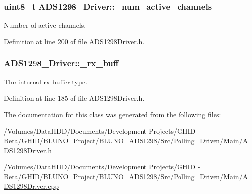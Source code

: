 \hypertarget{class_a_d_s1298___driver_adffccf9bfd40ec402181967dd2a6291f}{
\subsubsection[{\-\_\-num\-\_\-active\-\_\-channels}]{\setlength{\rightskip}{0pt plus 5cm}uint8\-\_\-t {\bf \-A\-D\-S1298\-\_\-\-Driver\-::\-\_\-num\-\_\-active\-\_\-channels}}}\label{class_a_d_s1298___driver_adffccf9bfd40ec402181967dd2a6291f}


\-Number of active channels. 



\-Definition at line 200 of file \-A\-D\-S1298\-Driver.\-h.

\hypertarget{class_a_d_s1298___driver_ab7156a79b770bfa6d44e753e5d81ceb7}{
\subsubsection[{\-\_\-rx\-\_\-buff}]{ {\bf \-A\-D\-S1298\-\_\-\-Driver\-::\-\_\-rx\-\_\-buff}}}\label{class_a_d_s1298___driver_ab7156a79b770bfa6d44e753e5d81ceb7}


\-The internal rx buffer type. 



\-Definition at line 185 of file \-A\-D\-S1298\-Driver.\-h.



\-The documentation for this class was generated from the following files\-:\begin{DoxyCompactItemize}
\item 
/\-Volumes/\-Data\-H\-D\-D/\-Documents/\-Development Projects/\-G\-H\-I\-D -\/ Beta/\-G\-H\-I\-D/\-B\-L\-U\-N\-O\-\_\-\-Project/\-B\-L\-U\-N\-O\-\_\-\-A\-D\-S1298/\-Src/\-Polling\-\_\-\-Driven/\-Main/\hyperlink{_a_d_s1298_driver_8h}{\-A\-D\-S1298\-Driver.\-h}\item 
/\-Volumes/\-Data\-H\-D\-D/\-Documents/\-Development Projects/\-G\-H\-I\-D -\/ Beta/\-G\-H\-I\-D/\-B\-L\-U\-N\-O\-\_\-\-Project/\-B\-L\-U\-N\-O\-\_\-\-A\-D\-S1298/\-Src/\-Polling\-\_\-\-Driven/\-Main/\hyperlink{_a_d_s1298_driver_8cpp}{\-A\-D\-S1298\-Driver.\-cpp}\end{DoxyCompactItemize}
